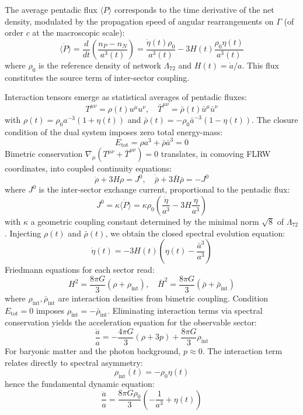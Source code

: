 \documentclass[11pt]{article}
\begin{document}
The average pentadic flux \(\langle \dot{P} \rangle\) corresponds to the
time derivative of the net density, modulated by the propagation speed
of angular rearrangements on \(\Gamma\) (of order \(c\) at the
macroscopic scale): \[
\langle \dot{P} \rangle = \frac{d}{dt} \left( \frac{n_P - n_N}{a^3(t)} \right) = \frac{\dot{\eta}(t) \rho_0}{a^3(t)} - 3H(t)\frac{\rho_0 \eta(t)}{a^3(t)}
\] where \(\rho_0\) is the reference density of network \(\Lambda_{72}\)
and \(H(t) = \dot{a}/a\). This flux constitutes the source term of
inter-sector coupling.

Interaction tensors emerge as statistical averages of pentadic fluxes:
\[
T^{\mu\nu} = \rho(t) u^\mu u^\nu, \quad \bar{T}^{\mu\nu} = \bar{\rho}(t) \bar{u}^\mu \bar{u}^\nu
\] with \(\rho(t) = \rho_0 a^{-3}(1+\eta(t))\) and
\(\bar{\rho}(t) = -\rho_0 \bar{a}^{-3}(1-\eta(t))\). The closure
condition of the dual system imposes zero total energy-mass: \[
E_{\text{tot}} = \rho a^3 + \bar{\rho} \bar{a}^3 = 0
\] Bimetric conservation \(\nabla_\mu(T^{\mu\nu}+\bar{T}^{\mu\nu})=0\)
translates, in comoving FLRW coordinates, into coupled continuity
equations: \[
\dot{\rho} + 3H\rho = J^0, \quad \dot{\bar{\rho}} + 3\bar{H}\bar{\rho} = -J^0
\] where \(J^0\) is the inter-sector exchange current, proportional to
the pentadic flux: \[
J^0 = \kappa \langle \dot{P} \rangle = \kappa \rho_0 \left( \frac{\dot{\eta}}{a^3} - 3H\frac{\eta}{a^3} \right)
\] with \(\kappa\) a geometric coupling constant determined by the
minimal norm \(\sqrt{8}\) of \(\Lambda_{72}\). Injecting \(\rho(t)\) and
\(\bar{\rho}(t)\), we obtain the closed spectral evolution equation: \[
\dot{\eta}(t) = -3H(t) \left( \eta(t) - \frac{\bar{a}^3}{a^3} \right)
\] Friedmann equations for each sector read: \[
H^2 = \frac{8\pi G}{3}(\rho + \rho_{\text{int}}), \quad \bar{H}^2 = \frac{8\pi G}{3}(\bar{\rho} + \bar{\rho}_{\text{int}})
\] where \(\rho_{\text{int}}, \bar{\rho}_{\text{int}}\) are interaction
densities from bimetric coupling. Condition \(E_{\text{tot}}=0\) imposes
\(\rho_{\text{int}} = -\bar{\rho}_{\text{int}}\). Eliminating
interaction terms via spectral conservation yields the acceleration
equation for the observable sector: \[
\frac{\ddot{a}}{a} = -\frac{4\pi G}{3}(\rho + 3p) + \frac{8\pi G}{3}\rho_{\text{int}}
\] For baryonic matter and the photon background, \(p \approx 0\). The
interaction term relates directly to spectral asymmetry: \[
\rho_{\text{int}}(t) = -\rho_0 \eta(t)
\] hence the fundamental dynamic equation: \[
\boxed{
\frac{\ddot{a}}{a} = \frac{8\pi G \rho_0}{3} \left( -\frac{1}{a^3} + \eta(t) \right)
}
\]
\end{document}
